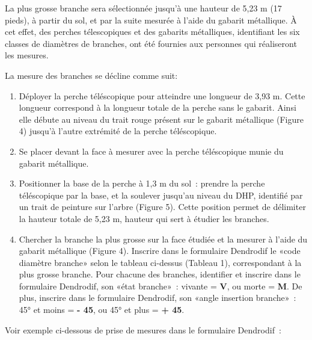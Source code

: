 \documentclass[letterpaper, 12pt]{article}
\begin{document}
\begin{onehalfspace}
\vspace{12pt}

La plus grosse branche sera sélectionnée jusqu’à une hauteur de 5,23 m (17 pieds), à partir du sol, et par la suite mesurée à l’aide du gabarit métallique. À cet effet, des perches télescopiques et des gabarits métalliques, identifiant les six classes de diamètres de branches, ont été fournies aux personnes qui réaliseront les mesures.

\vspace{12pt}

La mesure des branches se décline comme suit:

\begin{enumerate}
	
\item Déployer la perche téléscopique pour atteindre une longueur de 3,93 m. Cette longueur correspond à la longueur totale de la perche sans le gabarit. Ainsi elle débute au niveau du trait rouge présent sur le gabarit métallique (Figure 4) jusqu'à l'autre extrémité de la perche téléscopique.

\item Se placer devant la face à mesurer avec la perche téléscopique munie du gabarit métallique.

\item Positionner la base de la perche à  1,3 m du sol : prendre la perche téléscopique par la base, et la soulever jusqu'au niveau du DHP, identifié par un trait de peinture sur l'arbre (Figure 5). Cette position permet de délimiter la hauteur totale de 5,23 m, hauteur qui sert à étudier les branches.

\item Chercher la branche la plus grosse sur la face étudiée et la mesurer à l’aide du gabarit métallique (Figure 4). Inscrire dans le formulaire Dendrodif le «code diamètre branche» selon le tableau ci-dessus (Tableau 1), correspondant à la plus grosse branche. Pour chacune des branches, identifier et inscrire dans le formulaire Dendrodif, son «état branche» : vivante = \textbf{V}, ou morte = \textbf{M}.  De plus, inscrire dans le formulaire Dendrodif, son «angle insertion branche» : 45° et moins = \textbf{- 45}, ou 45° et plus = \textbf{+ 45}.

\end{enumerate}

\vspace{12pt}
 
Voir exemple ci-dessous de prise de mesures dans le formulaire Dendrodif :


\end{onehalfspace}
\end{document}
